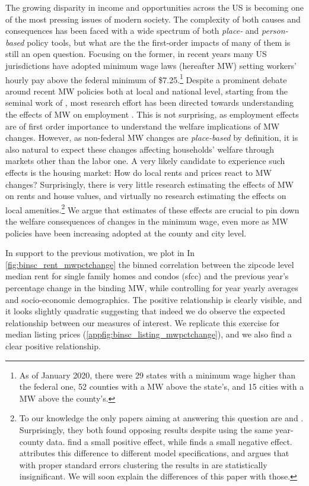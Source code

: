 
The growing disparity in income and opportunities across the US is becoming one of the most pressing issues of modern society. The complexity of both causes and consequences has been faced with a wide spectrum of both \textit{place-} and \textit{person-based} policy tools, but what are the the first-order impacts of many of them is still an open question. Focusing on the former, in recent years many US jurisdictions have adopted minimum wage laws (hereafter MW) setting workers' hourly pay above the federal minimum of \$7.25.\footnote{As of January 2020, there were 29 states with a minimum wage higher than the federal one, 52 counties with a MW above the state's, and 15 cities with a MW above the county's.} Despite a prominent debate around recent MW policies both at local and national level, starting from the seminal work of \textcite{card2000minimum}, most research effort has been directed towards understanding the effects of MW on employment \parencite[e.g,][]{dube2010minimum, neumark2006minimum, cengiz2019effect}. This is not surprising, as employment effects are of first order importance to understand the welfare implications of MW changes. However, as non-federal MW changes are \textit{place-based} by definition, it is also natural to expect these changes affecting households' welfare through markets other than the labor one. A very likely candidate to experience such effects is the housing market: How do local rents and prices react to MW changes? Surprisingly, there is very little research estimating the effects of MW on rents and house values, and virtually no research estimating the effects on local amenities.\footnote{To our knowledge the only papers aiming at answering this question are \textcite{yamagishi2019minimum} and \textcite{tidemann2018mw}. Surprisingly, they both found opposing results despite using the same year-county data. \textcite{yamagishi2019minimum} find a small positive effect, while \textcite{tidemann2018mw} finds a small negative effect. \textcite{yamagishi2019minimum} attributes this difference to different model specifications, and argues that with proper standard errors clustering the results in \textcite{tidemann2018mw} are statistically insignificant. We will soon explain the differences of this paper with those.} We argue that estimates of these effects are crucial to pin down the welfare consequences of changes in the minimum wage, even more as MW policies have been increasing adopted at the county and city level.

In support to the previous motivation, we plot in In \autoref{fig:binsc_rent_mwpctchange} the binned correlation between the zipcode level median rent for single family homes and condos (sfcc) and the previous year's percentage change in the binding MW, while controlling for year yearly averages and socio-economic demographics. The positive relationship is clearly visible, and it looks slightly quadratic suggesting that indeed we do observe the expected relationship between our measures of interest. We replicate this exercise for median listing prices (\autoref{appfig:binsc_listing_mwpctchange}), and we also find a clear positive relationship. 

